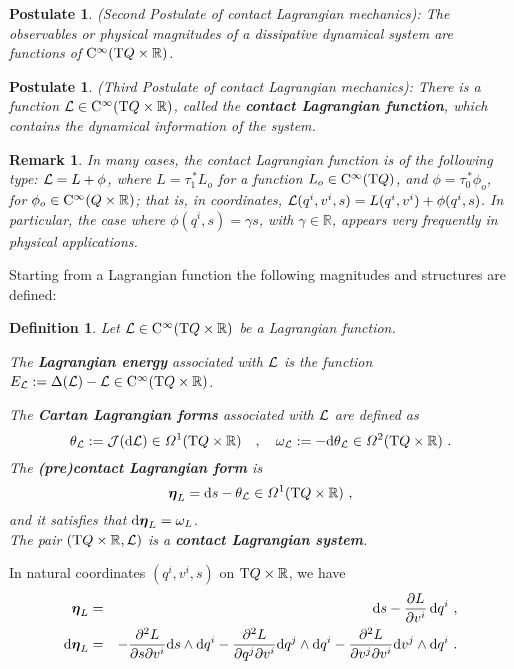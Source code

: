 \documentclass[12pt]{report}
\newtheorem{definition}[teor]{Definition}
\newtheorem{remark}[teor]{Remark}
\newtheorem{pos}[teor]{Postulate}
\def\beann{\begin{eqnarray*}}
\def\eeann{\end{eqnarray*}}
\def\df{{\mit\Omega}}
\def\Lag{{\cal L}}
\def\d{{\rm d}}
\def\Real{\mathbb{R}}
\def\bmeta{\mbox{\boldmath $\eta$}}
\def\Tan{{\rm T}}
\def\Cinfty{{\rm C}^\infty}
\begin{document}
\begin{pos}
{\rm (Second Postulate of contact Lagrangian mechanics\/)}:
The observables or physical magnitudes of a 
dissipative dynamical system are functions of $\Cinfty(\Tan Q\times\Real)$.
\end{pos}

\begin{pos}
{\rm (Third Postulate of contact Lagrangian mechanics\/)}:
There is a function $\Lag\in\Cinfty (\Tan Q\times\Real)$, 
called the {\sl \textbf{contact Lagrangian function}},
which contains the dynamical information of the system.
\end{pos}

\begin{remark}{\rm
In many cases, the contact Lagrangian function is of the following type:
$\Lag=L+\phi$, 
where $L=\tau_1^{\,*}L_o$ for a function
$L_o\in\Cinfty(\Tan Q)$, and $\phi=\tau_0^{\,*}\phi_o$, for $\phi_o\in\Cinfty(Q\times\Real)$;
that is, in coordinates, $\Lag(q^i,v^i,s)=L(q^i,v^i)+\phi(q^i,s)$.
In particular, the case where $\phi(q^i,s)=\gamma s$, with $\gamma\in\Real$,
appears very frequently in physical applications.   
}\end{remark}

Starting from a Lagrangian function the following magnitudes and structures are defined:

\begin{definition}
\label{definition:lagrangian-function}
Let $\Lag\in\Cinfty(\Tan Q\times\Real)$ be a Lagrangian function.

\noindent The {\sl\textbf{Lagrangian energy}}
associated with $\Lag$ is the function $E_\Lag:= \Delta(\Lag)-\Lag\in\Cinfty(\Tan Q\times\Real)$. 

\noindent The {\sl\textbf{Cartan Lagrangian forms}}
associated with $\Lag$ are defined as
\begin{equation}
\label{eq:thetaL}
\theta_\Lag:={\cal J}(\d\Lag)\in\df^1(\Tan Q\times\Real) 
\quad ,\quad
\omega_\Lag:=-\d\theta_\Lag\in\df^2(\Tan Q\times\Real)  \ .
\end{equation}
The {\sl\textbf{(pre)contact Lagrangian form}} is
$$
\bmeta_L=\d s-\theta_\Lag\in\df^1(\Tan Q\times\Real)
\ ,
$$
and it satisfies that $\d\bmeta_L=\omega_L$.
\\
The pair $(\Tan Q\times\Real,\Lag)$ is a {\sl\textbf{contact Lagrangian system}}.
\end{definition}

In natural coordinates $(q^i, v^i, s)$ on $\Tan Q\times\Real$, we have
\beann
\bmeta_L&=&\d s-\frac{\partial L}{\partial v^i} \,\d q^i \ ,
\\ %
\d\bmeta_L&=& 
-\frac{\partial^2L}{\partial s\partial v^i}\d s\wedge\d q^i 
-\frac{\partial^2L}{\partial q^j\partial v^i}\d q^j\wedge\d q^i 
-\frac{\partial^2L}{\partial v^j\partial v^i}\d v^j\wedge\d q^i\ .
\eeann
\end{document}

